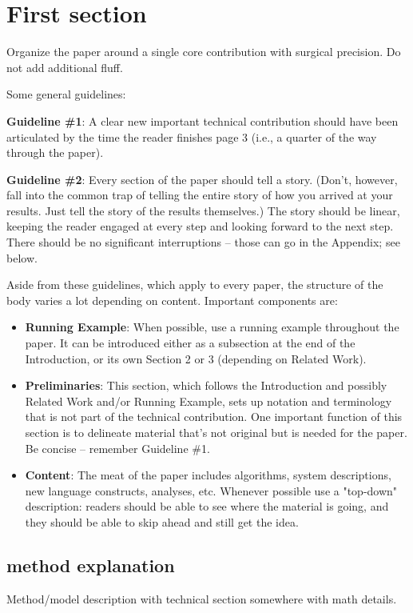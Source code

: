 \section{First section}
\label{body}

Organize the paper around a single core contribution with surgical precision. Do not add additional fluff.

Some general guidelines:

\textbf{Guideline \#1}: A clear new important technical contribution should have been articulated by the time the reader finishes page 3 (i.e., a quarter of the way through the paper).

\textbf{Guideline \#2}: Every section of the paper should tell a story. (Don't, however, fall into the common trap of telling the entire story of how you arrived at your results. Just tell the story of the results themselves.) The story should be linear, keeping the reader engaged at every step and looking forward to the next step. There should be no significant interruptions -- those can go in the Appendix; see below.

Aside from these guidelines, which apply to every paper, the structure of the body varies a lot depending on content. Important components are:

\begin{itemize}

    \item \textbf{Running Example}: When possible, use a running example throughout the paper. It can be introduced either as a subsection at the end of the Introduction, or its own Section 2 or 3 (depending on Related Work).
    \item \textbf{Preliminaries}: This section, which follows the Introduction and possibly Related Work and/or Running Example, sets up notation and terminology that is not part of the technical contribution. One important function of this section is to delineate material that's not original but is needed for the paper. Be concise -- remember Guideline \#1.
    \item \textbf{Content}: The meat of the paper includes algorithms, system descriptions, new language constructs, analyses, etc. Whenever possible use a "top-down" description: readers should be able to see where the material is going, and they should be able to skip ahead and still get the idea.
\end{itemize}

\subsection{method explanation}
Method/model description with technical section somewhere with math details.

